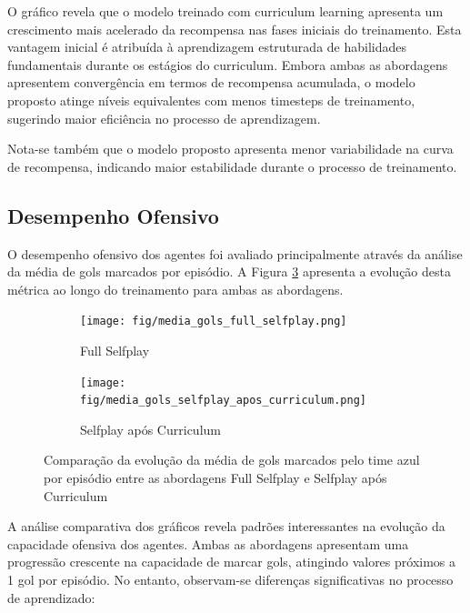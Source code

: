 O gráfico revela que o modelo treinado com curriculum learning apresenta um crescimento mais acelerado da recompensa nas fases iniciais do treinamento. Esta vantagem inicial é atribuída à aprendizagem estruturada de habilidades fundamentais durante os estágios do curriculum. Embora ambas as abordagens apresentem convergência em termos de recompensa acumulada, o modelo proposto atinge níveis equivalentes com menos timesteps de treinamento, sugerindo maior eficiência no processo de aprendizagem.

Nota-se também que o modelo proposto apresenta menor variabilidade na curva de recompensa, indicando maior estabilidade durante o processo de treinamento.

\subsection{Desempenho Ofensivo}

O desempenho ofensivo dos agentes foi avaliado principalmente através da análise da média de gols marcados por episódio. A Figura \ref{fig:goals_blue_comparison} apresenta a evolução desta métrica ao longo do treinamento para ambas as abordagens.

\begin{figure}[H]
    \centering
    \begin{subfigure}[b]{0.49\textwidth}
        \centering
        \texttt{[image: fig/media\_gols\_full\_selfplay.png]}
        \caption{Full Selfplay}
        \label{fig:goals_full_selfplay}
    \end{subfigure}
    \hfill
    \begin{subfigure}[b]{0.49\textwidth}
        \centering
        \texttt{[image: fig/media\_gols\_selfplay\_apos\_curriculum.png]}
        \caption{Selfplay após Curriculum}
        \label{fig:goals_selfplay_curriculum}
    \end{subfigure}
    \caption{Comparação da evolução da média de gols marcados pelo time azul por episódio entre as abordagens Full Selfplay e Selfplay após Curriculum}
    \label{fig:goals_blue_comparison}
\end{figure}

A análise comparativa dos gráficos revela padrões interessantes na evolução da capacidade ofensiva dos agentes. Ambas as abordagens apresentam uma progressão crescente na capacidade de marcar gols, atingindo valores próximos a 1 gol por episódio. No entanto, observam-se diferenças significativas no processo de aprendizado:


